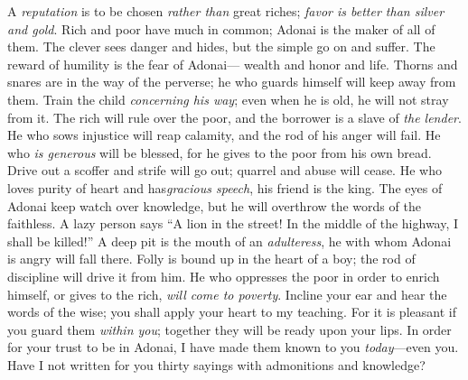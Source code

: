 \begin{biblechapter} %
\verse A \textit{reputation} is to be chosen \textit{rather than} great riches; 
\textit{favor is better than silver and gold}.
\verse Rich and poor have much in common; 
Adonai is the maker of all of them.
\verse The clever sees danger and hides, 
but the simple go on and suffer.
\verse The reward of humility is the fear of Adonai— 
wealth and honor and life.
\verse Thorns and snares are in the way of the perverse; 
he who guards himself will keep away from them.
\verse Train the child \textit{concerning his way}; 
even when he is old, he will not stray from it.
\verse The rich will rule over the poor, 
and the borrower is a slave of \textit{the lender}.
\verse He who sows injustice will reap calamity, 
and the rod of his anger will fail.
\verse He who \textit{is generous} will be blessed, 
for he gives to the poor from his own bread.
\verse Drive out a scoffer and strife will go out; 
quarrel and abuse will cease.
\verse He who loves purity of heart 
and has\textit{gracious speech}, his friend is the king.
\verse The eyes of Adonai keep watch over knowledge, 
but he will overthrow the words of the faithless.
\verse A lazy person says “A lion in the street! 
In the middle of the highway, I shall be killed!”
\verse A deep pit is the mouth of an \textit{adulteress}, 
he with whom Adonai is angry will fall there.
\verse Folly is bound up in the heart of a boy; 
the rod of discipline will drive it from him.
\verse He who oppresses the poor in order to enrich himself, 
or gives to the rich, \textit{will come to poverty}.
 Incline your ear and hear the words of the wise; 
you shall apply your heart to my teaching.
\verse For it is pleasant if you guard them \textit{within you}; 
together they will be ready upon your lips.
\verse In order for your trust to be in Adonai, 
I have made them known to you \textit{today}—even you.
\verse Have I not written for you thirty sayings 
with admonitions and knowledge?

\end{biblechapter}
